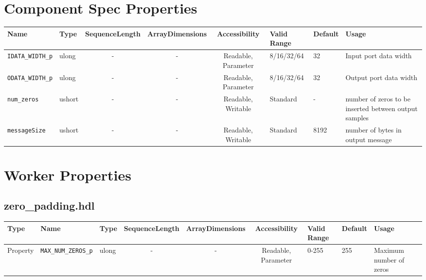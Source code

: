 \documentclass{article}
\def\comp{zero\_padding}
\begin{document}
\begin{landscape}
	\section*{Component Spec Properties}
	\begin{scriptsize}
		\begin{tabular}{|p{2cm}|p{1.5cm}|c|c|c|p{1.5cm}|p{1cm}|p{7cm}|}
			\hline
			\rowcolor{blue}
			Name                 & Type   & SequenceLength & ArrayDimensions & Accessibility       & Valid Range & Default & Usage                                                 \\
			\hline
			\verb+IDATA_WIDTH_p+ & ulong  & -              & -               & Readable, Parameter & 8/16/32/64  & 32      & Input port data width                                 \\
			\hline
			\verb+ODATA_WIDTH_p+ & ulong  & -              & -               & Readable, Parameter & 8/16/32/64  & 32      & Output port data width                                \\
			\hline
			\verb+num_zeros+     & ushort & -              & -               & Readable, Writable  & Standard    & -       & number of zeros to be inserted between output samples \\
			\hline
			\verb+messageSize+   & ushort & -              & -               & Readable, Writable  & Standard    & 8192    & number of bytes in output message \\
			\hline
		\end{tabular}
	\end{scriptsize}

	\section*{Worker Properties}
	\subsection*{\comp.hdl}
	\begin{scriptsize}
		\begin{tabular}{|p{2cm}|p{2cm}|p{1cm}|c|c|c|p{2cm}|p{1cm}|p{4cm}|}
			\hline
			\rowcolor{blue}
			Type     & Name                   & Type  & SequenceLength & ArrayDimensions & Accessibility       & Valid Range & Default & Usage                   \\
			\hline
			Property & \verb+MAX_NUM_ZEROS_p+ & ulong & -              & -               & Readable, Parameter & 0-255       & 255     & Maximum number of zeros \\
			\hline
		\end{tabular}
	\end{scriptsize}


\end{landscape}
\end{document}
